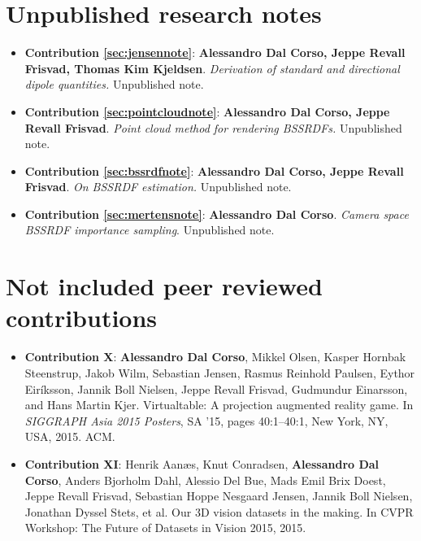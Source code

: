 \section*{Unpublished research notes}
\begin{itemize}
\item  \textbf{Contribution \ref{sec:jensennote}}: \textbf{Alessandro Dal Corso, Jeppe Revall Frisvad, Thomas Kim Kjeldsen}. \textit{Derivation of standard and directional dipole quantities.} Unpublished note. %
\item  \textbf{Contribution \ref{sec:pointcloudnote}}: \textbf{Alessandro Dal Corso, Jeppe Revall Frisvad}. \textit{Point cloud method for rendering BSSRDFs.} Unpublished note. %
\item  \textbf{Contribution \ref{sec:bssrdfnote}}: \textbf{Alessandro Dal Corso, Jeppe Revall Frisvad}. \textit{On BSSRDF estimation.} Unpublished note. %
\item  \textbf{Contribution \ref{sec:mertensnote}}:  \textbf{Alessandro Dal Corso}. \textit{Camera space BSSRDF importance sampling}. Unpublished note. %
\end{itemize}

\section*{Not included peer reviewed contributions}
\begin{itemize}
\item  \textbf{Contribution X}: \textbf{Alessandro Dal Corso}, Mikkel Olsen, Kasper Hornbak Steenstrup, Jakob Wilm, Sebastian Jensen, Rasmus Reinhold Paulsen, Eythor Eiríksson, Jannik Boll Nielsen, Jeppe Revall Frisvad, Gudmundur Einarsson, and Hans Martin Kjer. Virtualtable: A projection augmented reality game. In \textit{SIGGRAPH Asia 2015 Posters}, SA ’15, pages 40:1–40:1, New York, NY, USA, 2015. ACM.~\cite{dalcorsosig15}
\item  \textbf{Contribution XI}: Henrik Aanæs, Knut Conradsen, \textbf{Alessandro Dal Corso}, Anders Bjorholm Dahl, Alessio Del Bue, Mads Emil Brix Doest, Jeppe Revall Frisvad, Sebastian Hoppe Nesgaard Jensen, Jannik Boll Nielsen, Jonathan Dyssel Stets, et al. Our 3D vision datasets in the making. In CVPR Workshop: The Future of Datasets in Vision 2015, 2015.~\cite{aanaes2015our}
\end{itemize}


